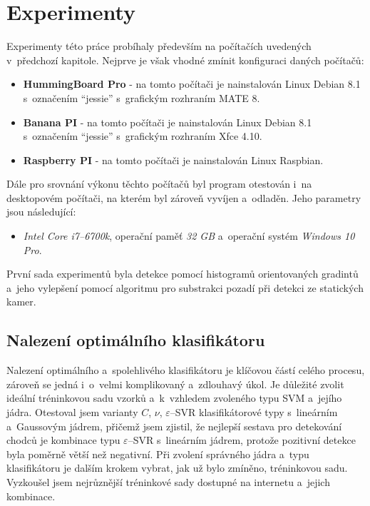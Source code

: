 \section{Experimenty}

Experimenty této práce probíhaly především na počítačích uvedených v~předchozí kapitole. Nejprve je však vhodné zmínit konfiguraci daných počítačů:
\begin{itemize}
\item\textbf{HummingBoard Pro} - na tomto počítači je nainstalován Linux Debian 8.1 s~označením ``jessie'' s~grafickým rozhraním MATE 8.
\item\textbf{Banana PI} - na tomto počítači je nainstalován Linux Debian 8.1 s~označením ``jessie'' s~grafickým rozhraním Xfce 4.10. 
\item\textbf{Raspberry PI} - na tomto počítači je nainstalován Linux Raspbian. 
\end{itemize}
Dále pro srovnání výkonu těchto počítačů byl program otestován i~na desktopovém počítači, na kterém byl zároveň vyvíjen a~odladěn. Jeho parametry jsou následující: 
\begin{itemize}
\item\textit{Intel Core i7--6700k}, operační paměť  \textit{32 GB} a~operační systém  \textit{Windows 10 Pro}.
\end{itemize}
První sada experimentů byla detekce pomocí histogramů orientovaných gradintů a~jeho vylepšení pomocí algoritmu pro substrakci pozadí při detekci ze statických kamer.

\subsection{Nalezení optimálního klasifikátoru}

Nalezení optimálního a~spolehlivého klasifikátoru je klíčovou částí celého procesu, zároveň se jedná i~o~velmi komplikovaný a~zdlouhavý úkol. Je důležité zvolit ideální tréninkovou sadu vzorků a~k~vzhledem zvoleného typu SVM a~jejího jádra. Otestoval jsem varianty $C$, $\nu$, $\varepsilon$--SVR klasifikátorové typy s~lineárním a~Gaussovým jádrem, přičemž jsem zjistil, že nejlepší sestava pro detekování chodců je kombinace typu $\varepsilon$--SVR s~lineárním jádrem, protože pozitivní detekce byla poměrně větší než negativní. Při zvolení správného jádra a~typu klasifikátoru je dalším krokem vybrat, jak už bylo zmíněno, tréninkovou sadu. Vyzkoušel jsem nejrůznější tréninkové sady dostupné na internetu a~jejich kombinace.

